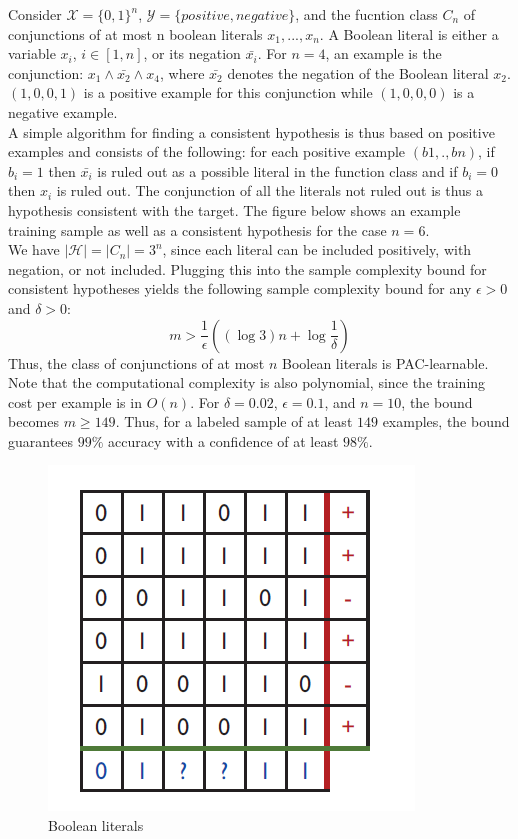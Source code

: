 \begin{example}
	Consider $\mathcal{X}=\{0,1\}^n$, $\mathcal{Y}=\{positive, negative\}$, and the fucntion class $C_n$ of conjunctions of at most n boolean literals $x_1,...,x_n$. A Boolean literal is either a variable $x_i$, $i\in [1, n]$, or its negation $\bar{x_i}$. For $n=4$, an example is the conjunction: $x_1\wedge \bar{x_2}\wedge x_4$, where $\bar{x_2}$ denotes the negation of the Boolean literal $x_2$. $(1,0,0,1)$ is a positive example for this conjunction while $(1,0,0,0)$ is a negative example.\\
	
	A simple algorithm for finding a consistent hypothesis is thus based on positive examples and consists of the following: for each positive example $(b1,., bn)$, if $b_i=1$ then $\bar{x_i}$ is ruled out as a possible literal in the function class and if $b_i=0$ then $x_i$ is ruled out. The conjunction of all the literals not ruled out is thus a hypothesis consistent with the target. The figure below shows an example training sample as well as a consistent hypothesis for the case $n=6$.\\
	
	We have $|\mathcal{H}|=|C_n|=3^n$, since each literal can be included positively, with
	negation, or not included. Plugging this into the sample complexity bound for
	consistent hypotheses yields the following sample complexity bound for any $\epsilon>0$ and $\delta>0$:
	\begin{equation}
	m>\frac{1}{\epsilon}\left((\log3)n+\log\frac{1}{\delta}\right)
	\end{equation}
	Thus, the class of conjunctions of at most $n$ Boolean literals is PAC-learnable. Note
	that the computational complexity is also polynomial, since the training cost per
	example is in $O(n)$. For $\delta=0.02$, $\epsilon=0.1$, and $n=10$, the bound becomes $m\geq149$. Thus, for a labeled sample of at least $149$ examples, the bound guarantees $99\%$
	accuracy with a confidence of at least $98\%$.
	
	\begin{figure}[htbp]
		\centering
		\includegraphics[width=0.6\linewidth]{6DL/figures/Boolean.png}
		\caption{Boolean literals}
		\label{Boolean literals}
	\end{figure}
	

\end{example}
